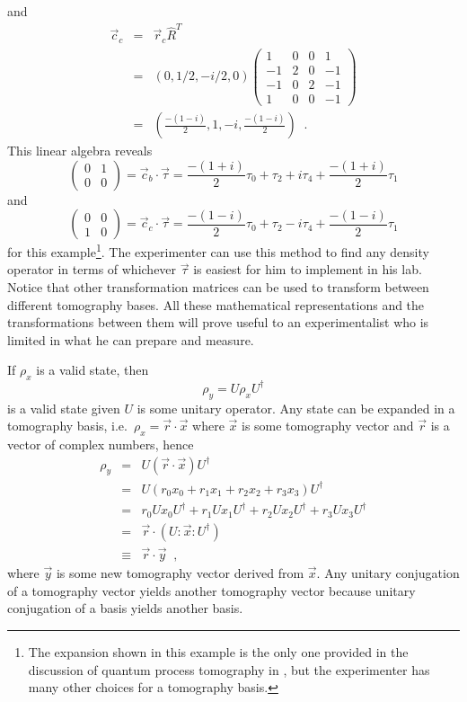 \begin{example}
and
\begin{eqnarray*}
\vec{c}_c &=& \vec{r}_c\hat{R}^T \\
&=& (0,1/2,-i/2,0)\begin{pmatrix}
1 & 0 & 0 & 1\\
-1 & 2 & 0 & -1\\
-1 & 0 & 2 & -1\\
1 & 0 & 0 & -1
\end{pmatrix}\\
&=& \left(\frac{-(1-i)}{2},1,-i,\frac{-(1-i)}{2}\right)\;\;.
\end{eqnarray*}
This linear algebra reveals
$$
\begin{pmatrix}
0 & 1\\
0 & 0
\end{pmatrix} = \vec{c}_b\cdot\vec{\tau} = \frac{-(1+i)}{2}\tau_0+\tau_2+i\tau_4+\frac{-(1+i)}{2}\tau_1
$$
and
$$
\begin{pmatrix}
0 & 0\\
1 & 0
\end{pmatrix} = \vec{c}_c\cdot\vec{\tau} = \frac{-(1-i)}{2}\tau_0+\tau_2-i\tau_4+\frac{-(1-i)}{2}\tau_1
$$
for this example\footnote{The expansion shown in this example is the only one provided in the discussion of quantum process tomography in \cite{Nielsen2010}, but the experimenter has many other choices for a tomography basis.}.  The experimenter can use this method to find any density operator in terms of whichever $\vec{\tau}$ is easiest for him to implement in his lab.  Notice that other transformation matrices can be used to transform between different tomography bases.  All these mathematical representations and the transformations between them will prove useful to an experimentalist who is limited in what he can prepare and measure.
\end{example}

If $\rho_x$ is a valid state, then 
$$
\rho_y = U\rho_x U^\dagger
$$
is a valid state given $U$ is some unitary operator.  Any state can be expanded in a tomography basis, i.e.\ $\rho_x=\vec{r}\cdot\vec{x}$ where $\vec{x}$ is some tomography vector and $\vec{r}$ is a vector of complex numbers, hence
\begin{eqnarray*}
\rho_y &=& U\left(\vec{r}\cdot\vec{x}\right)U^\dagger\\
&=& U\left( r_0x_0+r_1x_1+r_2x_2+r_3x_3\right)U^\dagger\\
&=& r_0Ux_0U^\dagger+r_1Ux_1U^\dagger+r_2Ux_2U^\dagger+r_3Ux_3U^\dagger\\
&=& \vec{r}\cdot \left(U:\vec{x}:U^\dagger\right)\\
&\equiv& \vec{r}\cdot\vec{y}\;\;,
\end{eqnarray*}
where $\vec{y}$ is some new tomography vector derived from $\vec{x}$.  Any unitary conjugation of a tomography vector yields another tomography vector because unitary conjugation of a basis yields another basis.  

